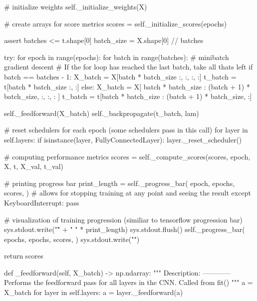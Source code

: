 \documentclass[%
oneside,                 %
final,                   %
10pt]{article}
\begin{document}
        # initialize weights
        self._initialize_weights(X)

        # create arrays for score metrics
        scores = self._initialize_scores(epochs)

        assert batches <= t.shape[0]
        batch_size = X.shape[0] // batches

        try:
            for epoch in range(epochs):
                for batch in range(batches):
                    # minibatch gradient descent
                    # If the for loop has reached the last batch, take all thats left
                    if batch == batches - 1:
                        X_batch = X[batch * batch_size :, :, :, :]
                        t_batch = t[batch * batch_size :, :]
                    else:
                        X_batch = X[
                            batch * batch_size : (batch + 1) * batch_size, :, :, :
                        ]
                        t_batch = t[batch * batch_size : (batch + 1) * batch_size, :]

                    self._feedforward(X_batch)
                    self._backpropagate(t_batch, lam)

                # reset schedulers for each epoch (some schedulers pass in this call)
                for layer in self.layers:
                    if isinstance(layer, FullyConnectedLayer):
                        layer._reset_scheduler()

                # computing performance metrics
                scores = self._compute_scores(scores, epoch, X, t, X_val, t_val)

                # printing progress bar
                print_length = self._progress_bar(
                    epoch,
                    epochs,
                    scores,
                )
        # allows for stopping training at any point and seeing the result
        except KeyboardInterrupt:
            pass

        # visualization of training progression (similiar to tensorflow progression bar)
        sys.stdout.write("\r" + " " * print_length)
        sys.stdout.flush()
        self._progress_bar(
            epochs,
            epochs,
            scores,
        )
        sys.stdout.write("")

        return scores

    def _feedforward(self, X_batch) -> np.ndarray:
        """
        Description:
        ------------
            Performs the feedforward pass for all layers in the CNN. Called from fit()
        """
        a = X_batch
        for layer in self.layers:
            a = layer._feedforward(a)
\end{document}
